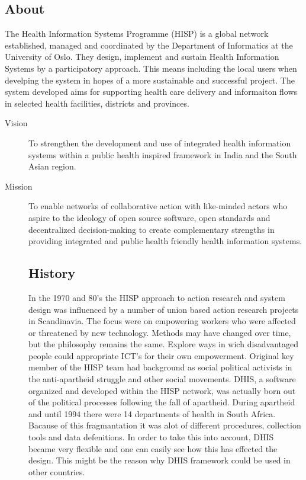 \subsection{About}
The Health Information Systems Programme (HISP) is a global network established, managed and coordinated by the Department of Informatics at the University of Oslo.
They design, implement and sustain Health Information Systems by a participatory approach\cite{8}. 
This means including the local users when develping the system in hopes of a more sustainable and successful project.
The system developed aims for supporting health care delivery and informaiton flows in selected health facilities, districts and provinces.
\begin{description}
\item[Vision] To strengthen the development and use of integrated health information systems within a public health inspired framework in India and the South Asian region\cite{9}.
\item[Mission] To enable networks of collaborative action with like-minded actors who aspire to the ideology of open source software, open standards and decentralized decision-making to create complementary strengths in providing integrated and public health friendly health information systems\cite{9}.
\subsection{History}
In the 1970 and 80's the HISP approach to action research and system design was influenced by a number of union based action research projects in Scandinavia.
The focus were on empowering workers who were affected or threatened by new technology.
Methods may have changed over time, but the philosophy remains the same.
Explore ways in wich disadvantaged people could appropriate ICT's for their own empowerment.
Original key member of the HISP team had background as social political activists in the anti-apartheid struggle and other social movements.
DHIS, a software organized and developed within the HISP network, was actually born out of the political processes following the fall of apartheid\cite{7}. 
During apartheid and until 1994 there were 14 departments of health in South Africa.
Bacause of this fragmantation it was alot of different procedures, collection tools and data defenitions. 
In order to take this into account, DHIS became very flexible and one can easily see how this has effected the design. 
This might be the reason why DHIS framework could be used in other countries.


\end{description}
